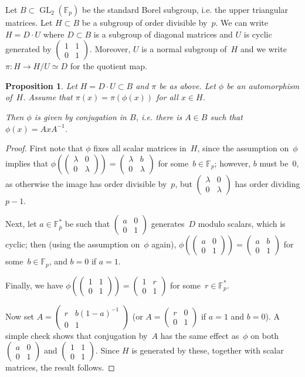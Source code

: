 \documentclass[twoside,leqno,symbols-for-thanks, draft]{rmi}
\numberwithin{equation}{section}
\newcommand{\Fp}{\mathbb{F}_p}
\newcommand{\Fpstar}{\mathbb{F}_p^*}
\newcommand{\GL}{\operatorname{GL}}
\newcommand{\mat}[4]{{\left(\begin{smallmatrix} #1 & #2 \\ #3 & #4 \end{smallmatrix} \right)}}
\newtheorem{proposition}[theorem]{Proposition}
\theoremstyle{remark}
\begin{document}
Let $B \subset \GL_2(\Fp)$ be the standard Borel subgroup, i.e. the
upper triangular matrices. Let $H \subset B$ be a subgroup of order
divisible by~$p$.  We can write~$H = D\cdot U$ where $D \subset B$ is
a subgroup of diagonal matrices and $U$ is cyclic generated by
$\mat{1}{1}{0}{1}$.  Moreover, $U$ is a normal subgroup of~$H$ and we
write $\pi : H \to H/U \simeq D$ for the quotient map.

\begin{proposition} \label{P:inner}
Let $H = D \cdot U \subset B$ and $\pi$ be as above. 
Let $\phi$ be an automorphism of~$H$. Assume that  
$\pi(x) = \pi(\phi(x))$ for all $x \in H$. 

Then $\phi$ is given by conjugation in $B$, i.e. there is $A \in B$ such that $\phi(x) = AxA^{-1}$. 
\end{proposition}
\begin{proof}
First note that $\phi$ fixes all scalar matrices in~$H$, since the
assumption on~$\phi$ implies that $\phi(\mat{\lambda}{0}{0}{\lambda})
= \mat{\lambda}{b}{0}{\lambda}$ for some~$b\in\Fp$; however, $b$ must
be~$0$, as otherwise the image has order divisible by~$p$, but $\mat{\lambda}{0}{0}{\lambda}$ has order dividing $p-1$.

Next, let $a\in\Fpstar$ be such that $\mat{a}{0}{0}{1}$ generates~$D$
modulo scalars, which is cyclic; then (using the assumption on~$\phi$
again), $\phi(\mat{a}{0}{0}{1}) = \mat{a}{b}{0}{1}$ for
some~$b\in\Fp$, and $b=0$ if $a=1$.

Finally, we have $\phi(\mat{1}{1}{0}{1}) = \mat{1}{r}{0}{1}$ for
some~$r\in\Fpstar$.

Now set $A=\mat{r}{b(1-a)^{-1}}{0}{1}$ (or $A=\mat{r}{0}{0}{1}$ if
$a=1$ and $b=0$).  A simple check shows that conjugation by~$A$ has
the same effect as~$\phi$ on both $\mat{a}{0}{0}{1}$ and
$\mat{1}{1}{0}{1}$.  Since $H$ is generated by these, together with
scalar matrices, the result follows.
\end{proof}
\end{document}
